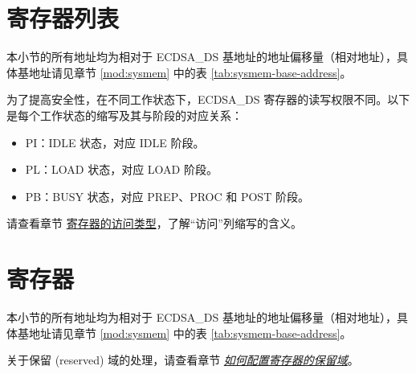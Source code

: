 \documentclass[main\_\_CN.tex]{subfiles}
\begin{document}
\newpage
\hypertarget{ecdsa-reg-summ}{}
\section{寄存器列表}
\label{sec:ecdsa-reg-summ}

本小节的所有地址均为相对于 ECDSA\_DS 基地址的地址偏移量（相对地址），具体基地址请见章节 \ref{mod:sysmem} \textit{} 中的表 \ref{tab:sysmem-base-address}。

为了提高安全性，在不同工作状态下，ECDSA\_DS 寄存器的读写权限不同。以下是每个工作状态的缩写及其与阶段的对应关系：

\begin{itemize}
    \item PI：IDLE 状态，对应 IDLE 阶段。
    \item PL：LOAD 状态，对应 LOAD 阶段。
    \item PB：BUSY 状态，对应 PREP、PROC 和 POST 阶段。
\end{itemize}

请查看章节 \hyperref[glossary-access-types]{寄存器的访问类型}，了解“访问”列缩写的含义。






\newpage
\section{寄存器}

本小节的所有地址均为相对于 ECDSA\_DS 基地址的地址偏移量（相对地址），具体基地址请见章节 \ref{mod:sysmem} \textit{} 中的表 \ref{tab:sysmem-base-address}。

关于保留 (reserved) 域的处理，请查看章节 \hyperref[programming-reserved-field]{\textit{如何配置寄存器的保留域}}。


\end{document}
